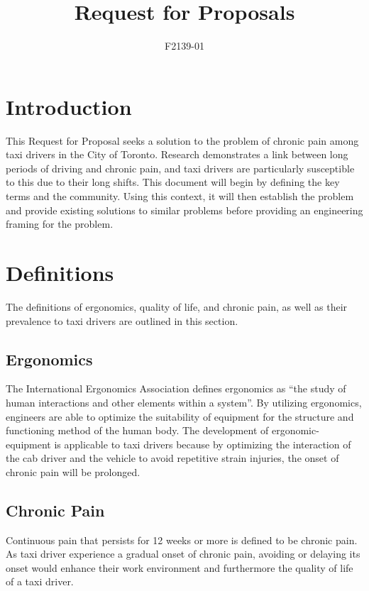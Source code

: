 \documentclass[11pt]{article}
\begin{document}
\title{Request for Proposals}
\author{F2139-01}
\maketitle

\section{Introduction}
\label{sec:intro}
This Request for Proposal seeks a solution to the problem of chronic
pain among taxi drivers in the City of Toronto. Research demonstrates a
link between long periods of driving and chronic pain\cite{KneePain, Okunribido2008}, and taxi drivers
are particularly susceptible to this due to their long shifts\cite{thestar2012}.
This document will begin by defining the key terms and the community.
Using this context, it will then establish the problem and provide existing
solutions to similar problems before providing an engineering framing for the problem.
\section{Definitions}
\label{sec:defs}
The definitions of ergonomics, quality of life, and chronic pain, as
well as their prevalence to taxi drivers are outlined in this section.

\subsection{Ergonomics}
\label{sec:ergonomics}

The International Ergonomics Association defines ergonomics as “the
study of human interactions and other elements within a system”. By
utilizing ergonomics, engineers are able to optimize the suitability
of equipment for the structure and functioning method of the human
body. The development of ergonomic- equipment is applicable to
taxi drivers because by optimizing the interaction of the cab driver
and the vehicle to avoid repetitive strain injuries, the onset of
chronic pain will be prolonged.

\subsection{Chronic Pain}
\label{sec:pain}

Continuous pain that persists for 12 weeks or more is defined to be
chronic pain. As taxi driver experience a gradual onset of chronic
pain, avoiding or delaying its onset would enhance their work
environment and furthermore the quality of life of a taxi driver.
\end{document}
